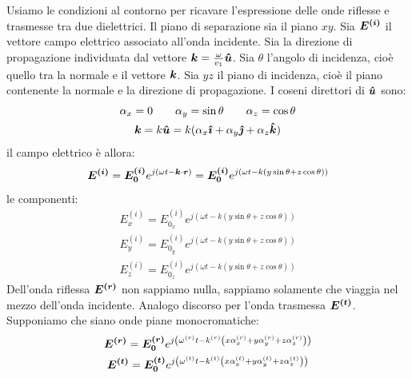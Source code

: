 Usiamo le condizioni al contorno per ricavare l'espressione delle onde riflesse e trasmesse tra due dielettrici. Il piano di separazione sia il piano $xy$. Sia $\boldsymbol{E^{(i)}}$ il vettore campo elettrico associato all'onda incidente. Sia la direzione di propagazione individuata dal vettore $\boldsymbol{k}=\frac{\omega}{v_1}\boldsymbol{\hat {u}}$. Sia $\theta$ l'angolo di incidenza, cioè quello tra la normale e il vettore $\boldsymbol{k}$. Sia $yz$ il piano di incidenza, cioè il piano contenente la normale e la direzione di propagazione. I coseni direttori di $\boldsymbol{\hat {u}}$ sono:
\begin{subequations}
  \begin{gather}
    \alpha_x = 0\qquad \alpha_y = \sin\theta\qquad \alpha_z = \cos \theta\\
    \boldsymbol{k} = k\boldsymbol{\hat {u}}=k(\alpha_x\boldsymbol{\hat {\imath}}+\alpha_y\boldsymbol{\hat {\jmath}}+\alpha_z\boldsymbol{\hat {k}})
  \end{gather}
\end{subequations}
il campo elettrico è allora:
\begin{equation}
  \boldsymbol{E^{(i)}}=\boldsymbol{E^{(i)}_0}e^{j\left(\omega t-\boldsymbol{k}\cdot\boldsymbol{r}\right)}=\boldsymbol{E^{(i)}_0}e^{j\left(\omega t-k\left(y\sin\theta+z\cos\theta\right)\right)}
\end{equation}
le componenti:
\begin{subequations}
  \begin{gather}
    E^{(i)}_x=E^{(i)}_{0_x}e^{j\left(\omega t-k\left(y\sin\theta+z\cos\theta\right)\right)}\\
    E^{(i)}_y=E^{(i)}_{0_y}e^{j\left(\omega t-k\left(y\sin\theta+z\cos\theta\right)\right)}\\
    E^{(i)}_z=E^{(i)}_{0_z}e^{j\left(\omega t-k\left(y\sin\theta+z\cos\theta\right)\right)}
  \end{gather}
\end{subequations}
Dell'onda riflessa $\boldsymbol{E^{(r)}}$ non sappiamo nulla, sappiamo solamente che viaggia nel mezzo dell'onda incidente. Analogo discorso per l'onda trasmessa $\boldsymbol{E^{(t)}}$. Supponiamo che siano onde piane monocromatiche:
\begin{subequations}
  \begin{gather}
    \boldsymbol{E^{(r)}}=\boldsymbol{E^{(r)}_0}e^{j\left(\omega^{(r)} t-k^{(r)}\left(x\alpha^{(r)}_x+y\alpha^{(r)}_y+z\alpha^{(r)}_z\right)\right)}\\
    \boldsymbol{E^{(t)}}=\boldsymbol{E^{(t)}_0}e^{j\left(\omega^{(t)} t-k^{(t)}\left(x\alpha^{(t)}_x+y\alpha^{(t)}_y+z\alpha^{(t)}_z\right)\right)}
  \end{gather}
\end{subequations}
